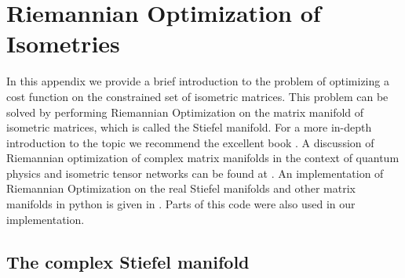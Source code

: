 \documentclass[encoding=utf8,british]{template/thesis}
\begin{document}
	\appendix
	
	\chapter{Riemannian Optimization of Isometries}
	
	In this appendix we provide a brief introduction to the problem of optimizing a cost function on the constrained set of isometric matrices. This problem can be solved by performing Riemannian Optimization on the matrix manifold of isometric matrices, which is called the Stiefel manifold. For a more in-depth introduction to the topic we recommend the excellent book \cite{cite:optimization_on_matrix_manifolds}. A discussion of Riemannian optimization of complex matrix manifolds in the context of quantum physics and isometric tensor networks can be found at \cite{cite:riemannian_geometry_automatic_differentiation_quantum_physics, cite:riemannian_optimization_isometric_tensor_networks}. An implementation of Riemannian Optimization on the real Stiefel manifolds and other matrix manifolds in python is given in \cite{cite:pymanopt}. Parts of this code were also used in our implementation.
	
	\section{The complex Stiefel manifold}
	
\end{document}
